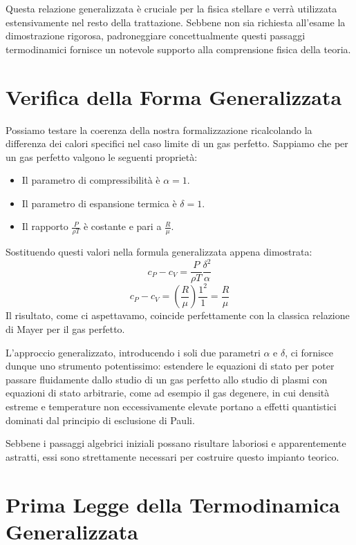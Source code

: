Questa relazione generalizzata è cruciale per la fisica stellare e verrà utilizzata estensivamente nel resto della trattazione. Sebbene non sia richiesta all'esame la dimostrazione rigorosa, padroneggiare concettualmente questi passaggi termodinamici fornisce un notevole supporto alla comprensione fisica della teoria.

\section{Verifica della Forma Generalizzata}

Possiamo testare la coerenza della nostra formalizzazione ricalcolando la differenza dei calori specifici nel caso limite di un gas perfetto.
Sappiamo che per un gas perfetto valgono le seguenti proprietà:
\begin{itemize}
\item Il parametro di compressibilità è $\alpha = 1$.
\item Il parametro di espansione termica è $\delta = 1$.
\item Il rapporto $\frac{P}{\rho T}$ è costante e pari a $\frac{R}{\mu}$.
\end{itemize}

Sostituendo questi valori nella formula generalizzata appena dimostrata:
\begin{equation}
c_P - c_V = \frac{P}{\rho T} \frac{\delta^2}{\alpha}
\end{equation}
\begin{equation}
c_P - c_V = \left( \frac{R}{\mu} \right) \frac{1^2}{1} = \frac{R}{\mu}
\end{equation}
Il risultato, come ci aspettavamo, coincide perfettamente con la classica relazione di Mayer per il gas perfetto.

L'approccio generalizzato, introducendo i soli due parametri $\alpha$ e $\delta$, ci fornisce dunque uno strumento potentissimo: estendere le equazioni di stato per poter passare fluidamente dallo studio di un gas perfetto allo studio di plasmi con equazioni di stato arbitrarie, come ad esempio il gas degenere, in cui densità estreme e temperature non eccessivamente elevate portano a effetti quantistici dominati dal principio di esclusione di Pauli.

Sebbene i passaggi algebrici iniziali possano risultare laboriosi e apparentemente astratti, essi sono strettamente necessari per costruire questo impianto teorico.

\section{Prima Legge della Termodinamica Generalizzata}

